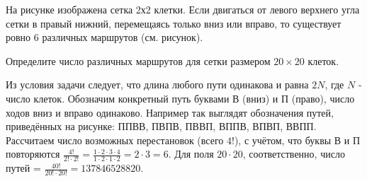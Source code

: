
На рисунке изображена сетка 2х2 клетки. Если двигаться от левого верхнего угла сетки в правый нижний, перемещаясь только вниз или вправо, то существует ровно 6 различных маршрутов (см. рисунок). 

Определите число различных маршрутов для сетки размером $20 \times 20$ клеток. 


\solutionSection

Из условия задачи следует, что длина любого пути одинакова и равна $2N$, где $N$ - число клеток. Обозначим конкретный путь буквами В (вниз) и П (право), число ходов вниз и вправо одинаково. Например так выглядят обозначения путей, приведённых на рисунке: ППВВ, ПВПВ, ПВВП, ВППВ, ВПВП, ВВПП. Рассчитаем число возможных перестановок (всего $4!$), с учётом, что буквы В и П повторяются $\frac{4!}{2!  \cdot  2!} = \frac{1 \cdot 2 \cdot 3 \cdot 4}{1 \cdot 2 \cdot 1 \cdot 2} = 2 \cdot 3 = 6$. Для поля $20 \cdot 20$, соответственно, число путей = $\frac{40!}{20!  \cdot  20!} = 137846528820$.


